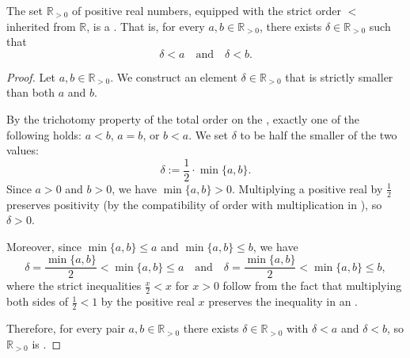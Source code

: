 \begin{lemma} \label{lemma:positive_real_numbers_for_a_codirected_strictly_ordered_set}
    The set $\mathbb{R}_{>0}$ of positive real numbers, equipped with the strict order $<$ inherited from $\mathbb{R}$, is a . That is, for every $a, b \in \mathbb{R}_{>0}$, there exists $\delta \in \mathbb{R}_{>0}$ such that
    \[
    \delta < a \quad \text{and} \quad \delta < b.
    \]
\end{lemma}
\begin{proof}
    Let $a, b \in \mathbb{R}_{>0}$. We construct an element $\delta \in \mathbb{R}_{>0}$ that is strictly smaller than both $a$ and $b$.

    By the trichotomy property of the total order on the , exactly one of the following holds: $a < b$, $a = b$, or $b < a$. We set $\delta$ to be half the smaller of the two values:
    $$\delta := \frac{1}{2} \cdot \min\{a, b\}.$$
    Since $a > 0$ and $b > 0$, we have $\min\{a, b\} > 0$. Multiplying a positive real by $\frac{1}{2}$ preserves positivity (by the compatibility of order with multiplication in ), so $\delta > 0$.

    Moreover, since $\min\{a, b\} \leq a$ and $\min\{a, b\} \leq b$, we have
    $$\delta = \frac{\min\{a, b\}}{2} < \min\{a, b\} \leq a \quad \text{and} \quad \delta = \frac{\min\{a, b\}}{2} < \min\{a, b\} \leq b,$$
    where the strict inequalities $\frac{x}{2} < x$ for $x > 0$ follow from the fact that multiplying both sides of $\frac{1}{2} < 1$ by the positive real $x$ preserves the inequality in an .

    Therefore, for every pair $a, b \in \mathbb{R}_{>0}$ there exists $\delta \in \mathbb{R}_{>0}$ with $\delta < a$ and $\delta < b$, so $\mathbb{R}_{>0}$ is .
\end{proof}